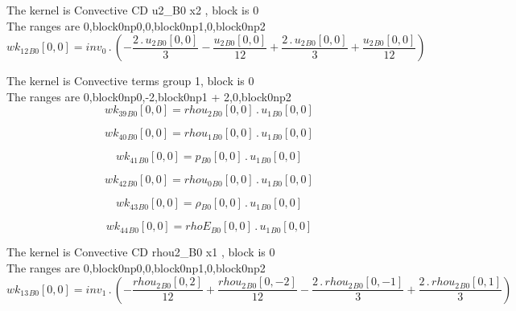\documentclass{article}
\begin{document}
\noindent The kernel is Convective CD u2_B0 x2 , block is 0\\\noindent The ranges are 0,block0np0,0,block0np1,0,block0np2\\\begin{dmath}{wk_{12}{_{B0}}}[{0,0}] = inv_0 \,.\, \left(- \frac{2 \,.\, {u_{2}{_{B0}}}[{0,0}]}{3} - \frac{{u_{2}{_{B0}}}[{0,0}]}{12} + \frac{2 \,.\, {u_{2}{_{B0}}}[{0,0}]}{3} + \frac{{u_{2}{_{B0}}}[{0,0}]}{12}\right)\end{dmath}

\noindent The kernel is Convective terms group 1, block is 0\\\noindent The ranges are 0,block0np0,-2,block0np1 + 2,0,block0np2\\\begin{dmath}{wk_{39}{_{B0}}}[{0,0}] = {rhou_{2}{_{B0}}}[{0,0}] \,.\, {u_{1}{_{B0}}}[{0,0}]\end{dmath}

\begin{dmath}{wk_{40}{_{B0}}}[{0,0}] = {rhou_{1}{_{B0}}}[{0,0}] \,.\, {u_{1}{_{B0}}}[{0,0}]\end{dmath}

\begin{dmath}{wk_{41}{_{B0}}}[{0,0}] = {p{_{B0}}}[{0,0}] \,.\, {u_{1}{_{B0}}}[{0,0}]\end{dmath}

\begin{dmath}{wk_{42}{_{B0}}}[{0,0}] = {rhou_{0}{_{B0}}}[{0,0}] \,.\, {u_{1}{_{B0}}}[{0,0}]\end{dmath}

\begin{dmath}{wk_{43}{_{B0}}}[{0,0}] = {\rho{_{B0}}}[{0,0}] \,.\, {u_{1}{_{B0}}}[{0,0}]\end{dmath}

\begin{dmath}{wk_{44}{_{B0}}}[{0,0}] = {rhoE{_{B0}}}[{0,0}] \,.\, {u_{1}{_{B0}}}[{0,0}]\end{dmath}

\noindent The kernel is Convective CD rhou2_B0 x1 , block is 0\\\noindent The ranges are 0,block0np0,0,block0np1,0,block0np2\\\begin{dmath}{wk_{13}{_{B0}}}[{0,0}] = inv_1 \,.\, \left(- \frac{{rhou_{2}{_{B0}}}[{0,2}]}{12} + \frac{{rhou_{2}{_{B0}}}[{0,-2}]}{12} - \frac{2 \,.\, {rhou_{2}{_{B0}}}[{0,-1}]}{3} + \frac{2 \,.\, {rhou_{2}{_{B0}}}[{0,1}]}{3}\right)\end{dmath}
\end{document}
